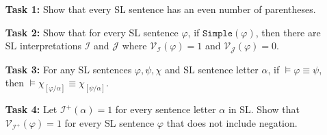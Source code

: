 \documentclass[a4paper, 11pt]{article} %
\newcommand{\I}{\mathcal{I}}
\newcommand{\J}{\mathcal{J}}
\newcommand{\even}{\texttt{Even}}
\newcommand{\simp}{\texttt{Simple}}
\newcommand{\V}[1]{\mathcal{V}_{#1}} %
\begin{document}
\begin{enumerate}
  \item[\bf Task 1:] Show that every SL sentence has an even number of parentheses. 
  \item[\bf Task 2:] Show that for every SL sentence $\varphi$, if $\simp(\varphi)$, then there are SL interpretations $\I$ and $\J$ where $\V{\I}(\varphi)=1$ and $\V{\J}(\varphi)=0$. 
  \item[\bf Task 3:] For any SL sentences $\varphi,\psi,\chi$ and SL sentence letter $\alpha$, if $\vDash \varphi \equiv \psi$, then $\vDash \chi_{[\varphi/\alpha]}\equiv\chi_{[\psi/\alpha]}$.
  \item[\bf Task 4:] Let $\I^+(\alpha)=1$ for every sentence letter $\alpha$ in SL. Show that $\V{\I^+}(\varphi)=1$ for every SL sentence $\varphi$ that does not include negation. 
\end{enumerate}






\end{document}
